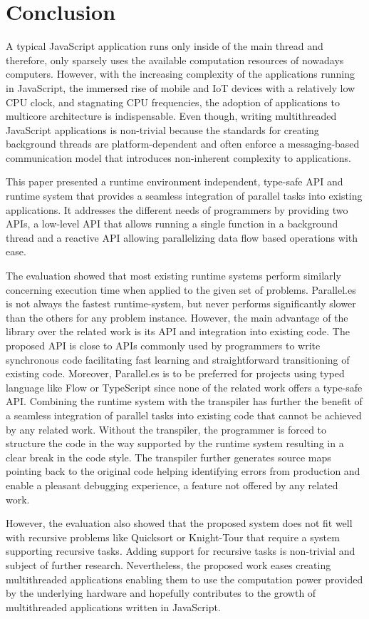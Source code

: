 \section{Conclusion}\label{sec:conclusion}
A typical JavaScript application runs only inside of the main thread and therefore, only sparsely uses the available computation resources of nowadays computers. However, with the increasing complexity of the applications running in JavaScript, the immersed rise of mobile and IoT devices with a relatively low CPU clock, and stagnating CPU frequencies, the adoption of applications to multicore architecture is indispensable. Even though, writing multithreaded JavaScript applications is non-trivial because the standards for creating background threads are platform-dependent and often enforce a messaging-based communication model that introduces non-inherent complexity to applications.

This paper presented a runtime environment independent, type-safe API and runtime system that provides a seamless integration of parallel tasks into existing applications. It addresses the different needs of programmers by providing two APIs, a low-level API that allows running a single function in a background thread and a reactive API allowing parallelizing data flow based operations with ease. 

The evaluation showed that most existing runtime systems perform similarly concerning execution time when applied to the given set of problems. Parallel.es is not always the fastest runtime-system, but never performs significantly slower than the others for any problem instance. However, the main advantage of the library over the related work is its API and integration into existing code.  The proposed API is close to APIs commonly used by programmers to write synchronous code facilitating fast learning and straightforward transitioning of existing code. Moreover, Parallel.es is to be preferred for projects using typed language like Flow or TypeScript since none of the related work offers a type-safe API. Combining the runtime system with the transpiler has further the benefit of a seamless integration of parallel tasks into existing code that cannot be achieved by any related work. Without the transpiler, the programmer is forced to structure the code in the way supported by the runtime system resulting in a clear break in the code style. The transpiler further generates source maps pointing back to the original code helping identifying errors from production and enable a pleasant debugging experience, a feature not offered by any related work.

However, the evaluation also showed that the proposed system does not fit well with recursive problems like Quicksort or Knight-Tour that require a system supporting recursive tasks. Adding support for recursive tasks is non-trivial and subject of further research. Nevertheless, the proposed work eases creating multithreaded applications enabling them to use the computation power provided by the underlying hardware and hopefully contributes to the growth of multithreaded applications written in JavaScript. 